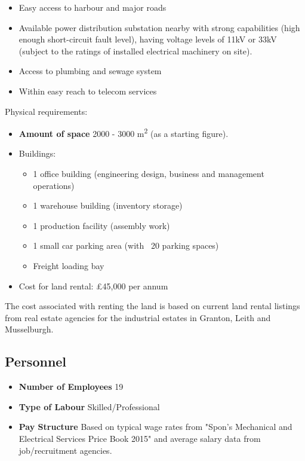 \documentclass[a4paper,11pt]{article}
\begin{document}
\begin{itemize}
	\item Easy access to harbour and major roads
	\item Available power distribution substation nearby with strong capabilities (high enough short-circuit fault level), having voltage levels of 11kV or 33kV (subject to the ratings of installed electrical machinery on site).
	\item Access to plumbing and sewage system
	\item Within easy reach to telecom services
\end{itemize}

Physical requirements:

\begin{itemize}
	\item \textbf{Amount of space} 2000 - 3000 m\textsuperscript{2} (as a starting figure).
	\item Buildings:
	
	\begin{itemize}
		\item 1 office building (engineering design, business and management operations)
		\item 1 warehouse building (inventory storage)
		\item 1 production facility (assembly work)
		\item 1 small car parking area (with ~20 parking spaces)
		\item Freight loading bay
	\end{itemize}
	
	\item Cost for land rental: £45,000 per annum
\end{itemize}

The cost associated with renting the land is based on current land rental listings from real estate agencies for the industrial estates in Granton, Leith and Musselburgh\cite{d4}.

\subsection{Personnel}
\begin{itemize}
	\item \textbf{Number of Employees} 19
	\item \textbf{Type of Labour} Skilled/Professional
	\item \textbf{Pay Structure} Based on typical wage rates from "Spon's Mechanical and Electrical Services Price Book 2015"\cite{d5} and average salary data from job/recruitment agencies\cite{d6}.
\end{itemize}
\end{document}
